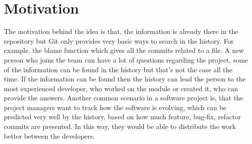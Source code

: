 \section{Motivation}
The motivation behind the idea is that, the information is already there in the repository but Git only provides very basic ways to search in the history. 
For example, the blame\cite{blame} function which gives all the commits related to a file. \newline
A new person who joins the team can have a lot of questions regarding the project, some of the information can be found in the history but that’s not the case all the time. If the information can be found then the history can lead the person to the most experienced developer, who worked on the module or created it, who can provide the answers.\newline
Another common scenario in a software project is, that the project managers want to track how the software is evolving, which can be predicted very well by the history, based on how much feature, bug-fix, refactor commits are presented. In this way, they would be able to distribute the work better between the developers.